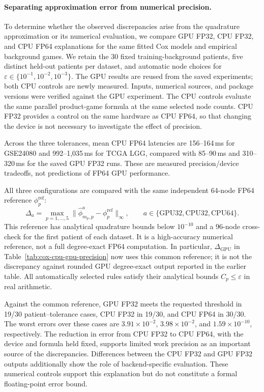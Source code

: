 \paragraph{Separating approximation error from numerical precision.}
To determine whether the observed discrepancies arise from the quadrature
approximation or its numerical evaluation, we compare GPU FP32, CPU FP32,
and CPU FP64 explanations for the same fitted Cox models and empirical
background games. We retain the 30 fixed training-background patients,
five distinct held-out patients per dataset, and automatic node choices for
$\varepsilon\in\{10^{-1},10^{-2},10^{-3}\}$.
The GPU results are reused from the saved experiments; both CPU controls
are newly measured. Inputs, numerical sources, and package versions were
verified against the GPU experiment. The CPU controls evaluate the same
parallel product-game formula at the same selected node counts. CPU FP32
provides a control on the same hardware as CPU FP64, so that changing the
device is not necessary to investigate the effect of precision.

Across the three tolerances, mean CPU FP64 latencies are 156--164\,ms
for GSE24080 and 992--1,035\,ms for TCGA LGG, compared with
85--90\,ms and 310--320\,ms for the saved GPU FP32 runs.
These are measured precision/device tradeoffs, not predictions of
FP64 GPU performance.

All three configurations are compared with the same independent 64-node
FP64 reference $\phi^{\mathrm{ref}}_p$:
\[
\Delta_a=\max_{p=1,\ldots,5}
\|\widehat\phi^{a}_{m_p,p}-\phi^{\mathrm{ref}}_p\|_\infty,
\qquad a\in\{\mathrm{GPU32},\mathrm{CPU32},\mathrm{CPU64}\}.
\]
This reference has analytical quadrature bounds below $10^{-10}$ and a
96-node cross-check for the first patient of each dataset. It is a
high-accuracy numerical reference, not a full degree-exact FP64 computation.
In particular, $\Delta_{\mathrm{GPU}}$ in
Table~\ref{tab:cox-cpu-gpu-precision} now uses this common reference;
it is not the discrepancy against rounded GPU degree-exact output reported
in the earlier table. All automatically selected rules satisfy their
analytical bounds $C_p\le\varepsilon$ in real arithmetic.

Against the common reference, GPU FP32 meets the requested threshold in
19/30 patient--tolerance cases, CPU FP32 in 19/30,
and CPU FP64 in 30/30. The worst errors over these cases are
$3.91\times10^{-2}$, $3.98\times10^{-2}$, and $1.59\times10^{-10}$, respectively.
The reduction in error from CPU FP32 to CPU FP64, with the device and
formula held fixed, supports limited work precision as an important source
of the discrepancies. Differences between the CPU FP32 and GPU FP32
outputs additionally show the role of backend-specific evaluation.
These numerical controls support this explanation but do not constitute
a formal floating-point error bound.

